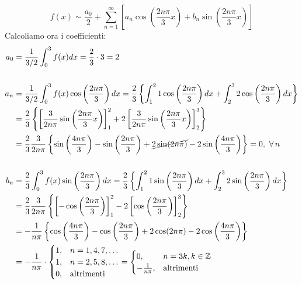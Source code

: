 \begin{figure}[htpb]
\end{figure}
\FloatBarrier

\begin{equation*}
f(x) \sim \frac{a_{0}}{2} + \sum\limits ^{\infty }_{n = 1}\left[ a_{n}\cos\left(\frac{2n\pi }{3} x\right) + b_{n}\sin\left(\frac{2n\pi }{3} x\right)\right]
\end{equation*}
Calcoliamo ora i coefficienti:
\begin{align*}
a_{0} & = \frac{1}{3/2}\int ^{3}_{0} f(x)dx = \frac{2}{3} \cdot 3 = 2\\
 & \\
a_{n} & = \frac{1}{3/2}\int ^{3}_{0} f(x)\cos\left(\frac{2n\pi }{3}\right) dx = \frac{2}{3}\left\{\int ^{2}_{1} 1\cos\left(\frac{2n\pi }{3}\right) dx + \int ^{3}_{2} 2\cos\left(\frac{2n\pi }{3}\right) dx\right\}\\
 & = \frac{2}{3}\left\{\left[\frac{3}{2n\pi }\sin\left(\frac{2n\pi }{3} x\right)\right]^{2}_{1} + 2\left[\frac{3}{2n\pi }\sin\left(\frac{2n\pi }{3} x\right)\right]^{3}_{2}\right\}\\
 & = \frac{2}{3}\frac{3}{2n\pi }\left\{\sin\left(\frac{4n\pi }{3}\right) - \sin\left(\frac{2n\pi }{3}\right) + \cancel{2\sin(2n\pi)} - 2\sin\left(\frac{4n\pi }{3}\right)\right\} = 0,\ \forall n\\
 & \\
b_{n} & = \frac{2}{3}\int ^{3}_{0} f(x)\sin\left(\frac{2n\pi }{3}\right) dx = \frac{2}{3}\left\{\int ^{2}_{1} 1\sin\left(\frac{2n\pi }{3}\right) dx + \int ^{3}_{2} 2\sin\left(\frac{2n\pi }{3}\right) dx\right\}\\
 & = \frac{2}{3}\frac{3}{2n\pi }\left\{\left[ - \cos\left(\frac{2n\pi }{3}\right)\right]^{2}_{1} - 2\left[\cos\left(\frac{2n\pi }{3}\right)\right]^{3}_{2}\right\}\\
 & = - \frac{1}{n\pi }\left\{\cos\left(\frac{4n\pi }{3}\right) - \cos\left(\frac{2n\pi }{3}\right) + 2\cos(2n\pi) - 2\cos\left(\frac{4n\pi }{3}\right)\right\}\\
 & = - \frac{1}{n\pi } \cdot \begin{cases}
1, & n = 1,4,7,\dotsc \\
1, & n = 2,5,8,\dotsc \\
0, & \text{altrimenti}
\end{cases} = \begin{cases}
0, & n = 3k,k\in \ZZ \\
- \frac{1}{n\pi } , & \text{altrimenti}
\end{cases}
\end{align*}
